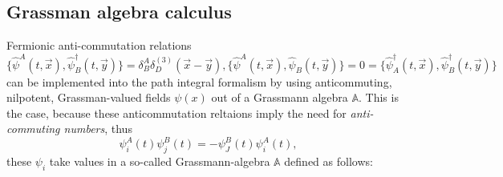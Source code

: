 \subsection{Grassman algebra calculus}
Fermionic anti-commutation relations $\{\hat{\psi}^A(t,\vec{x}), \hat{\psi}^{\dagger}_B(t,\vec{y})  \} = \delta^A_B \delta^{(3)}_D(\vec{x}-\vec{y}), \{\hat{\psi}^A(t,\vec{x}), \hat{\psi}_B(t,\vec{y}) \}=0=\{\hat{\psi}^{\dagger}_A(t,\vec{x}), \hat{\psi}^{\dagger}_B(t,\vec{y})  \}$ can be implemented into the path integral formalism by using anticommuting, nilpotent, Grassman-valued fields $\psi(x)$ out of a Grassmann algebra $\mathbb{A}$. This is the case, because these anticommutation reltaions imply the need for \emph{anti-commuting numbers}, thus
\begin{equation}
	\psi^A_i(t)\psi^B_j(t) = - \psi^B_J(t) \psi^A_i(t),
\end{equation}
these $\psi_i$ take values in a so-called Grassmann-algebra $\mathbb{A}$ defined as follows:
